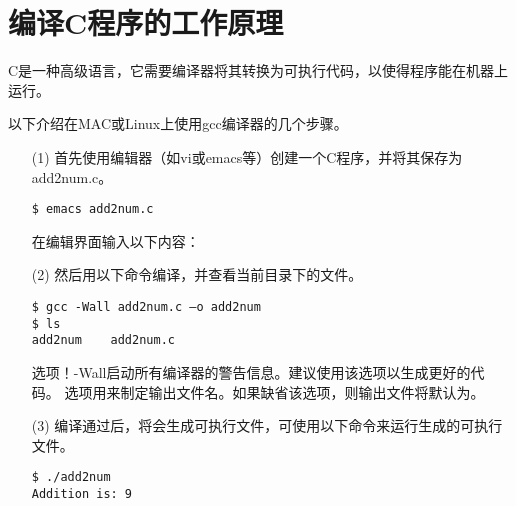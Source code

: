 \section{编译C程序的工作原理}
\begin{frame}\ft{\secname}
C是一种高级语言，它需要编译器将其转换为可执行代码，以使得程序能在机器上运行。 

以下介绍在MAC或Linux上使用gcc编译器的几个步骤。

\end{frame}


\begin{frame}[fragile]\ft{\secname}
\begin{itemize}

\item[(1)] 首先使用编辑器（如vi或emacs等）创建一个C程序，并将其保存为add2num.c。

\begin{lstlisting}[backgroundcolor=\color{red!10}]
$ emacs add2num.c
\end{lstlisting}
\end{itemize}
\end{frame}

\begin{frame}[fragile]\ft{\secname}
\begin{itemize}
\item[] 
在编辑界面输入以下内容：


\end{itemize}
\end{frame}

\begin{frame}[fragile]\ft{\secname}
\begin{itemize}
\item[(2)] 然后用以下命令编译，并查看当前目录下的文件。
\begin{lstlisting}[backgroundcolor=\color{red!10}]
$ gcc -Wall add2num.c –o add2num
$ ls
add2num    add2num.c
\end{lstlisting}
选项\blue！{\ttfamily -Wall}启动所有编译器的警告信息。建议使用该选项以生成更好的代码。 选项用来制定输出文件名。如果缺省该选项，则输出文件将默认为。
\end{itemize}
\end{frame}

\begin{frame}[fragile]\ft{\secname}
\begin{itemize}
\item[(3)] 编译通过后，将会生成可执行文件，可使用以下命令来运行生成的可执行文件。


\begin{lstlisting}[backgroundcolor=\color{red!10}]
$ ./add2num
Addition is: 9
\end{lstlisting}

\end{itemize}
\end{frame}



